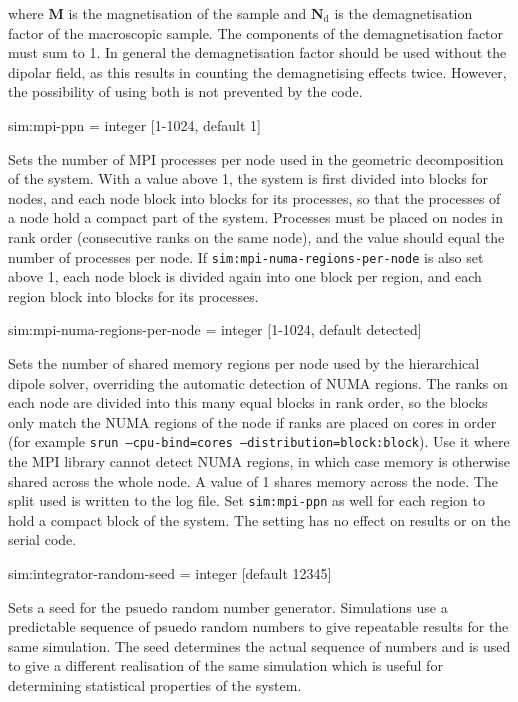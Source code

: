\noindent where $\mathbf{M}$ is the magnetisation of the sample and $\mathbf{N}_{\mathrm{d}}
$ is the demagnetisation factor of the macroscopic sample. The components of the demagnetisation factor must sum to 1. In general the demagnetisation factor should be used without the dipolar field, as this results in counting the demagnetising effects twice. However, the possibility of using both is not prevented by the code.


{\zicf sim:mpi-ppn = integer [1-1024, default 1]} Sets the number of MPI processes per node used in the geometric decomposition of the system. With a value above 1, the system is first divided into blocks for nodes, and each node block into blocks for its processes, so that the processes of a node hold a compact part of the system. Processes must be placed on nodes in rank order (consecutive ranks on the same node), and the value should equal the number of processes per node. If \texttt{sim:mpi-numa-regions-per-node} is also set above 1, each node block is divided again into one block per region, and each region block into blocks for its processes.

{\zicf sim:mpi-numa-regions-per-node = integer [1-1024, default detected]} Sets the number of shared memory regions per node used by the hierarchical dipole solver, overriding the automatic detection of NUMA regions. The ranks on each node are divided into this many equal blocks in rank order, so the blocks only match the NUMA regions of the node if ranks are placed on cores in order (for example \texttt{srun --cpu-bind=cores --distribution=block:block}). Use it where the MPI library cannot detect NUMA regions, in which case memory is otherwise shared across the whole node. A value of 1 shares memory across the node. The split used is written to the log file. Set \texttt{sim:mpi-ppn} as well for each region to hold a compact block of the system. The setting has no effect on results or on the serial code.

{\zicf sim:integrator-random-seed = integer [default 12345]} Sets a seed for the psuedo random number generator. Simulations use a predictable sequence of psuedo random numbers to give repeatable results for the same simulation. The seed determines the actual sequence of numbers and is used to give a different realisation of the same simulation which is useful for determining statistical properties of the system.

